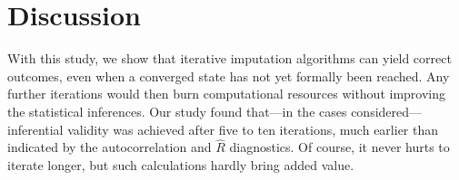 \documentclass{article}
\begin{document}
\section{Discussion}
\label{discussion}

With this study, we show that iterative imputation algorithms can yield correct outcomes, even when a converged state has not yet formally been reached. Any further iterations would then burn computational resources without improving the statistical inferences. Our study found that---in the cases considered---inferential validity was achieved after five to ten iterations, much earlier than indicated by the autocorrelation and \(\widehat{R}\) diagnostics. Of course, it never hurts to iterate longer, but such calculations hardly bring added value.





\end{document}
